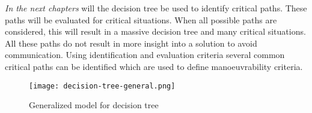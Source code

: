 \emph{In the next chapters} will the decision tree be used to identify critical paths. These paths will be evaluated for critical situations. When all possible paths are considered, this will result in a massive decision tree and many critical situations. All these paths do not result in more insight into a solution to avoid communication. Using identification and evaluation criteria several common critical paths can be identified which are used to define manoeuvrability criteria.

\begin{figure}[p]
	\centering
	\texttt{[image: decision-tree-general.png]}
	\caption{Generalized model for decision tree}
	\label{fig:decision-tree-general}
\end{figure}
